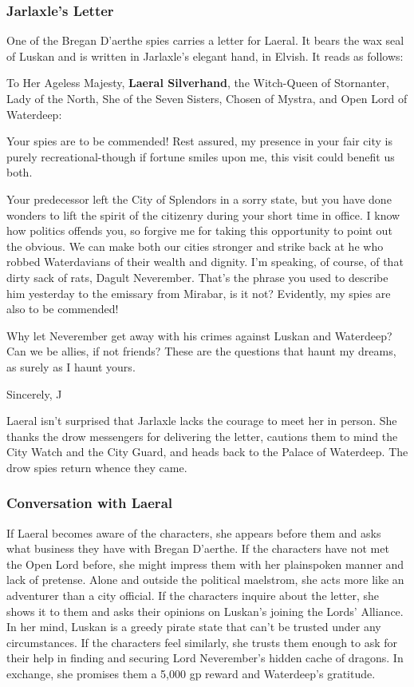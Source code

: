 \documentclass[10pt,a4paper,twoside,twocolumn,openany,nodeprecatedcode]{dndbook}
\begin{document}
\subsubsection{Jarlaxle's Letter}
One of the Bregan D'aerthe spies carries a letter for Laeral. It bears the wax seal of Luskan and is written in Jarlaxle's elegant hand, in Elvish. It reads as follows:
\begin{DndReadAloud}{}
To Her Ageless Majesty, \textbf{Laeral Silverhand}, the Witch-Queen of Stornanter, Lady of the North, She of the Seven Sisters, Chosen of Mystra, and Open Lord of Waterdeep:

Your spies are to be commended! Rest assured, my presence in your fair city is purely recreational-though if fortune smiles upon me, this visit could benefit us both.

Your predecessor left the City of Splendors in a sorry state, but you have done wonders to lift the spirit of the citizenry during your short time in office. I know how politics offends you, so forgive me for taking this opportunity to point out the obvious. We can make both our cities stronger and strike back at he who robbed Waterdavians of their wealth and dignity. I'm speaking, of course, of that dirty sack of rats, Dagult Neverember. That's the phrase you used to describe him yesterday to the emissary from Mirabar, is it not? Evidently, my spies are also to be commended!

Why let Neverember get away with his crimes against Luskan and Waterdeep? Can we be allies, if not friends? These are the questions that haunt my dreams, as surely as I haunt yours.

Sincerely, J
\end{DndReadAloud}

Laeral isn't surprised that Jarlaxle lacks the courage to meet her in person. She thanks the drow messengers for delivering the letter, cautions them to mind the City Watch and the City Guard, and heads back to the Palace of Waterdeep. The drow spies return whence they came.
\subsubsection{Conversation with Laeral}
If Laeral becomes aware of the characters, she appears before them and asks what business they have with Bregan D'aerthe. If the characters have not met the Open Lord before, she might impress them with her plainspoken manner and lack of pretense. Alone and outside the political maelstrom, she acts more like an adventurer than a city official.
If the characters inquire about the letter, she shows it to them and asks their opinions on Luskan's joining the Lords' Alliance. In her mind, Luskan is a greedy pirate state that can't be trusted under any circumstances. If the characters feel similarly, she trusts them enough to ask for their help in finding and securing Lord Neverember's hidden cache of dragons. In exchange, she promises them a 5,000 gp reward and Waterdeep's gratitude.
\end{document}
